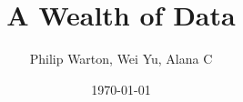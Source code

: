 \documentclass{article}
\begin{document}
\title{A Wealth of Data}
\author{Philip Warton, Wei Yu, Alana C}
\date{\today}
\maketitle
\end{document}
